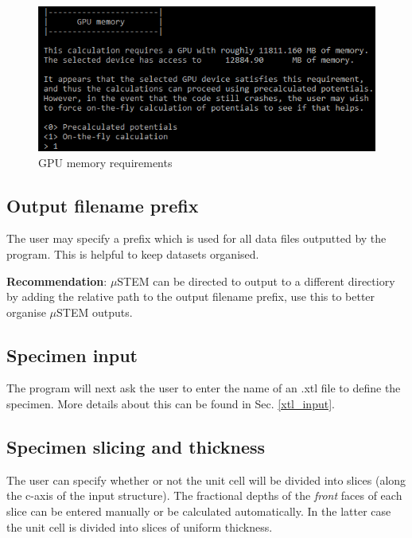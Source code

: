 \documentclass[12pt,a4paper]{article}
\begin{document}
\begin{figure}[!h]
\begin{center}
\includegraphics[scale=0.75]{GPU_memory.png}
\caption{GPU memory requirements}
\label{fig:GPU_memory}
\end{center}
\end{figure}

\subsection{Output filename prefix}

The user may specify a prefix which is used for all data files outputted by the program.
This is helpful to keep datasets organised.

{\bf Recommendation}: $\mu$STEM can be directed to output to a different directiory by adding the relative path to the output filename prefix, use this to better organise $\mu$STEM outputs.

\subsection{Specimen input}

The program will next ask the user to enter the name of an .xtl file to define the specimen.
More details about this can be found in Sec. \ref{xtl_input}.

\subsection{Specimen slicing and thickness \label{sec:thickness}}

The user can specify whether or not the unit cell will be divided into slices (along the c-axis of the input structure).
The fractional depths of the \emph{front} faces of each slice can be entered manually or be calculated automatically.
In the latter case the unit cell is divided into slices of uniform thickness.
\end{document}

